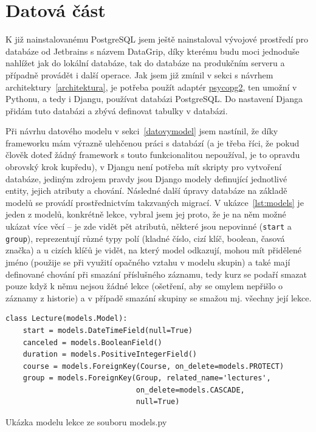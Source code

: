     \section{Datová část}\label{sec:datovaCast}
    K již nainstalovanému PostgreSQL jsem ještě nainstaloval vývojové prostředí pro databáze od Jetbrains s názvem DataGrip, díky kterému budu moci jednoduše nahlížet jak do lokální databáze, tak do databáze na produkčním serveru a případně provádět i další operace. Jak jsem již zmínil v sekci s návrhem architektury~\ref{architektura}, je potřeba použít adaptér \href{http://initd.org/psycopg/}{psycopg2}, ten umožní v Pythonu, a tedy i Djangu, používat databázi PostgreSQL. Do nastavení Djanga přidám tuto databázi a zbývá definovat tabulky v databázi.
    
    Při návrhu datového modelu v sekci~\ref{datovymodel} jsem nastínil, že díky frameworku mám výrazně ulehčenou práci s databází (a je třeba říci, že pokud člověk doteď žádný framework s touto funkcionalitou nepoužíval, je to opravdu obrovský krok kupředu), v Djangu není potřeba mít skripty pro vytvoření databáze, jediným zdrojem pravdy jsou Django modely definující jednotlivé entity, jejich atributy a chování. Následné další úpravy databáze na základě modelů se provádí prostřednictvím takzvaných migrací. V ukázce~\ref{lst:models} je jeden z modelů, konkrétně lekce, vybral jsem jej proto, že je na něm možné ukázat více věcí -- je zde vidět pět atributů, některé jsou nepovinné (\verb|start| a \verb|group|), reprezentují různé typy polí (kladné číslo, cizí klíč, boolean, časová značka) a u cizích klíčů je vidět, na který model odkazují, mohou mít přidělené jméno (použije se při využití opačného vztahu v modelu skupin) a také mají definované chování při smazání příslušného záznamu, tedy kurz se podaří smazat pouze když k němu nejsou žádné lekce (ošetření, aby se omylem nepřišlo o záznamy z historie) a v případě smazání skupiny se smažou mj. všechny její lekce.
    
    \begin{listing}[ht]
    	\begin{verbatim}
class Lecture(models.Model):
    start = models.DateTimeField(null=True)
    canceled = models.BooleanField()
    duration = models.PositiveIntegerField()
    course = models.ForeignKey(Course, on_delete=models.PROTECT)
    group = models.ForeignKey(Group, related_name='lectures',
                              on_delete=models.CASCADE,
                              null=True)
    	\end{verbatim}
    	\caption{Ukázka modelu lekce ze souboru models.py}\label{lst:models}
    \end{listing}
    
